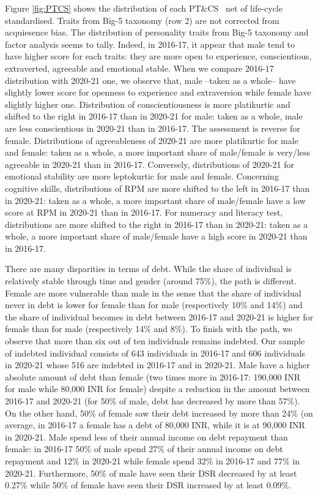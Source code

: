 \documentclass[a4paper, 11pt, onecolumn]{article}
\newcommand{\PTCS}{PT\&CS}
\begin{document}
Figure \ref{fig:PTCS} shows the distribution of each \PTCS~ net of life-cycle standardised.
Traits from Big-5 taxonomy (row 2) are not corrected from acquiesence bias.
The distribution of personality traits from Big-5 taxonomy and factor analysis seems to tally.
Indeed, in 2016-17, it appear that male tend to have higher score for each traits: they are more open to experience, conscientious, extraverted, agreeable and emotional stable.
When we compare 2016-17 distribution with 2020-21 one, we observe that, male --taken as a whole-- have slightly lower score for openness to experience and extraversion while female have slightly higher one.
Distribution of conscientiousness is more platikurtic and shifted to the right in 2016-17 than in 2020-21 for male: taken as a whole, male are less conscientious in 2020-21 than in 2016-17.
The assessment is reverse for female.
Distributions of agreeableness of 2020-21 are more platikurtic for male and female: taken as a whole, a more important share of male/female is very/less agreeable in 2020-21 than in 2016-17.
Conversely, distributions of 2020-21 for emotional stability are more leptokurtic for male and female.
Concerning cognitive skills, distributions of RPM are more shifted to the left in 2016-17 than in 2020-21: taken as a whole, a more important share of male/female have a low score at RPM in 2020-21 than in 2016-17.
For numeracy and literacy test, distributions are more shifted to the right in 2016-17 than in 2020-21: taken as a whole, a more important share of male/female have a high score in 2020-21 than in 2016-17.

There are many disparities in terms of debt.
While the share of individual is relatively stable through time and gender (around 75\%), the path is different.
Female are more vulnerable than male in the sense that the share of individual never in debt is lower for female than for male (respectively 10\% and 14\%) and the share of individual becomes in debt between 2016-17 and 2020-21 is higher for female than for male (respectively 14\% and 8\%).
To finish with the path, we observe that more than six out of ten individuals remains indebted.
Our sample of indebted individual consists of 643 individuals in 2016-17 and 606 individuals in 2020-21 whose 516 are indebted in 2016-17 and in 2020-21.
Male have a higher absolute amount of debt than female (two times more in 2016-17: 190,000 INR for male while 80,000 INR for female) despite a reduction in the amount between 2016-17 and 2020-21 (for 50\% of male, debt has decreased by more than 57\%).
On the other hand, 50\% of female saw their debt increased by more than 24\% (on average, in 2016-17 a female has a debt of 80,000 INR, while it is at 90,000 INR in 2020-21.
Male spend less of their annual income on debt repayment than female: in 2016-17 50\% of male spend 27\% of their annual income on debt repayment and 12\% in 2020-21 while female spend 32\% in 2016-17 and 77\% in 2020-21.
Furthermore, 50\% of male have seen their DSR decreased by at least 0.27\% while 50\% of female have seen their DSR increased by at least 0.09\%.
\end{document}
